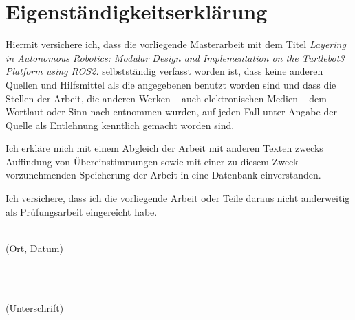 \chapter*{Eigenständigkeitserklärung}
Hiermit versichere ich, dass die vorliegende Masterarbeit mit dem Titel \textit{Layering in Autonomous Robotics: Modular Design and Implementation on the Turtlebot3 Platform using ROS2. } selbstständig verfasst worden ist, dass keine anderen Quellen und Hilfsmittel als die angegebenen benutzt worden sind und dass die Stellen der Arbeit, die anderen Werken -- auch elektronischen Medien -- dem Wortlaut oder Sinn nach entnommen wurden, auf jeden Fall unter Angabe der Quelle als Entlehnung kenntlich gemacht worden sind.

Ich erkläre mich mit einem Abgleich der Arbeit mit anderen Texten zwecks Auffindung von Übereinstimmungen sowie mit einer zu diesem Zweck vorzunehmenden Speicherung der Arbeit in eine Datenbank einverstanden.

Ich versichere, dass ich die vorliegende Arbeit oder Teile daraus nicht anderweitig als Prüfungsarbeit eingereicht habe.

\vspace*{2cm}

\begin{minipage}{0.5\textwidth}
  \begin{flushleft} \large
    \underline{\hspace{6cm}} \\
    {\footnotesize (Ort, Datum)}
  \end{flushleft}
\end{minipage}
~
\begin{minipage}{0.5\textwidth}
  \begin{flushright} \large
    \underline{\hspace{6cm}} \\
    {\footnotesize (Unterschrift)}
  \end{flushright}
\end{minipage}\\[0.5cm]